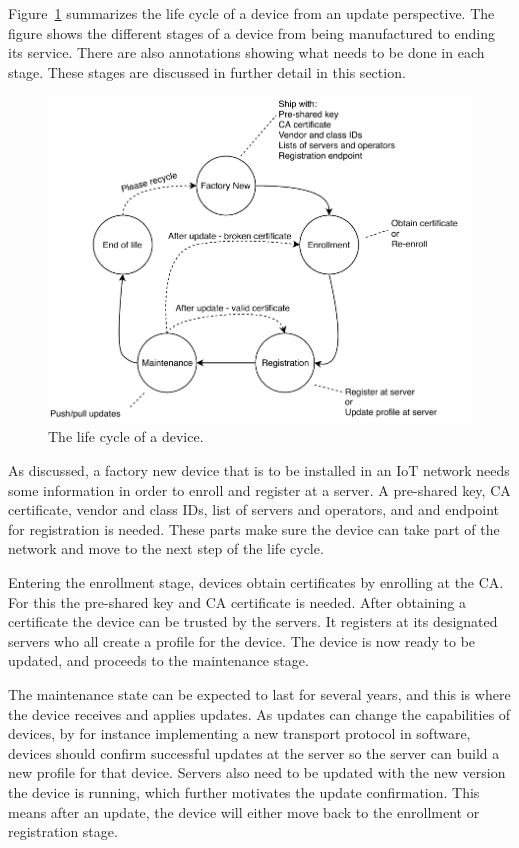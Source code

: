 \documentclass[0-thesis.tex]{subfiles}
\begin{document}
Figure~\ref{fig:lifecycle} summarizes the life cycle of a device from an update
perspective. The figure shows the different stages of a device from being manufactured to
ending its service. There are also annotations showing what needs to be done in each
stage. These stages are discussed in further detail in this section.

\begin{figure}
    \caption{The life cycle of a device.}
    \label{fig:lifecycle}
    \includegraphics{images/lifecycle.pdf}
\end{figure}


As discussed, a factory new device that is to be installed in an IoT network needs some
information in order to enroll and register at a server. A pre-shared key, CA certificate,
vendor and class IDs, list of servers and operators, and and endpoint for registration is
needed. These parts make sure the device can take part of the network and move to the next
step of the life cycle. 

Entering the enrollment stage, devices obtain certificates by enrolling at the CA. For
this the pre-shared key and CA certificate is needed. After obtaining a certificate the
device can be trusted by the servers. It registers at its designated servers who all
create a profile for the device. The device is now ready to be updated, and proceeds to
the maintenance stage.

The maintenance state can be expected to last for several years, and this is where the
device receives and applies updates. As updates can change the capabilities of devices, by
for instance implementing a new transport protocol in software, devices should confirm
successful updates at the server so the server can build a new profile for that device.
Servers also need to be updated with the new version the device is running, which further
motivates the update confirmation. This means after an update, the device will either move
back to the enrollment or registration stage.
\end{document}
